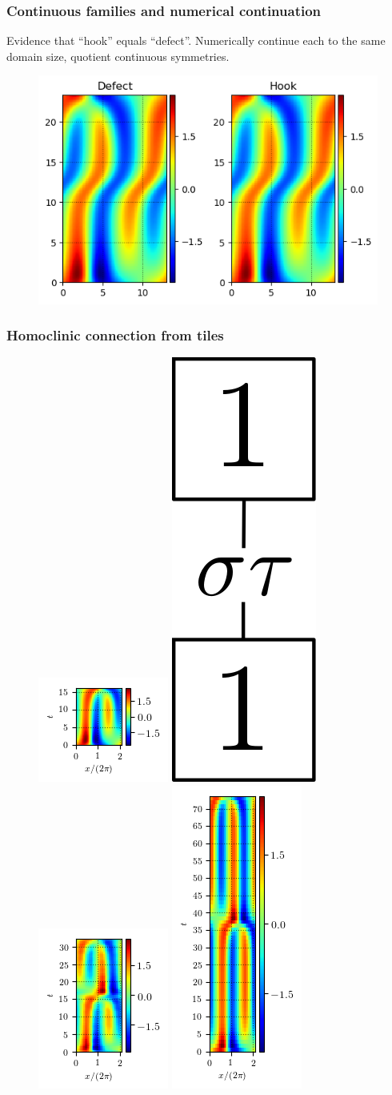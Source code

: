 \documentclass[mathserif, handout]{beamer}
\begin{document}
\begin{frame}%
  \frametitle{Continuous families and numerical continuation}
  Evidence that ``hook'' equals ``defect''. Numerically continue
  each to the same domain size, quotient continuous symmetries.
  \begin{figure}
  \includegraphics[width=.4\textwidth]{MNG_hookdefect_comparison}
  \end{figure}
\end{frame}

\begin{frame}%
  \frametitle{Homoclinic connection from tiles}
  \begin{figure}
  \includegraphics[width=.22\textwidth]{MNG_half_final}
  \includegraphics[width=.1\textwidth,height=.25\textheight]{MNG11symb}
  \includegraphics[width=.22\textwidth]{MNG11init}
  \includegraphics[width=.22\textwidth]{MNG11final}
  \end{figure}
\end{frame}
\end{document}
